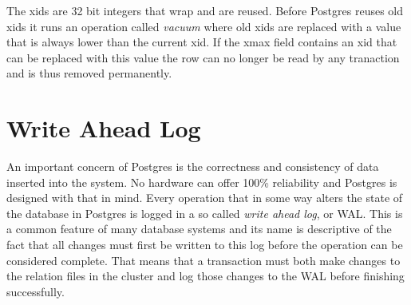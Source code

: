 \documentclass[a4paper,12pt,twoside,BCOR=10mm]{scrbook}
\begin{document}

The xids are 32 bit integers that wrap and are reused. Before Postgres reuses old xids it runs an operation called \textit{vacuum} where old xids are replaced with a value that is always lower than the current xid. If the xmax field contains an xid that can be replaced with this value the row can no longer be read by any tranaction and is thus removed permanently.


\section{Write Ahead Log}
An important concern of Postgres is the correctness and consistency of data inserted into the system. No hardware can offer 100\% reliability and Postgres is designed with that in mind. Every operation that in some way alters the state of the database in Postgres is logged in a so called \textit{write ahead log}, or WAL. This is a common feature of many database systems and its name is descriptive of the fact that all changes must first be written to this log before the operation can be considered complete. That means that a transaction must both make changes to the relation files in the cluster and log those changes to the WAL before finishing successfully.
\end{document}
